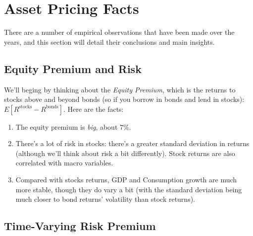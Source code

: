\documentclass[12pt]{article}
\theoremstyle{plain}
\theoremstyle{definition}
\theoremstyle{remark}
\begin{document}
\section{Asset Pricing Facts}

There are a number of empirical observations that have been made
over the years, and this section will detail their conclusions
and main insights.

\subsection{Equity Premium and Risk}

We'll beging by thinking about the \emph{Equity Premium}, which
is the returns to stocks above and beyond bonds (so if you borrow
in bonds and lend in stocks): $E[R^{\text{stocks}}-R^{\text{bonds}}]$.
Here are the facts:
\begin{enumerate}
    \item The equity premium is \emph{big}, about 7\%.
    \item There's a lot of risk in stocks: there's a greater
	standard deviation in returns (although we'll think about
	risk a bit differently). Stock returns are also correlated
	with macro variables.
    \item Compared with stocks returns, GDP and Consumption growth are much
	more stable, though they do vary a bit (with the standard deviation
	being much closer to bond returns' volatility than stock returns).
\end{enumerate}

\subsection{Time-Varying Risk Premium}
\end{document}
